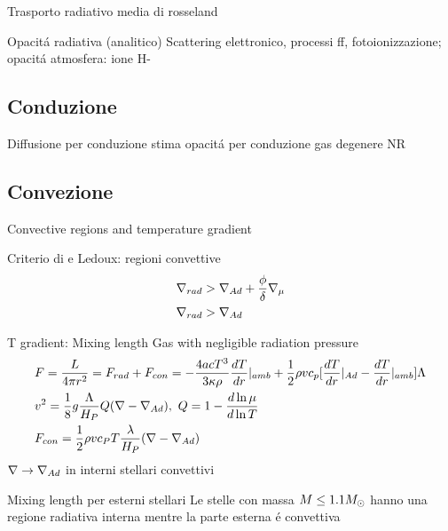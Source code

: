 \begin{frame}{Trasporto radiativo}
media di rosseland
\end{frame}

\begin{frame}{Opacit\'a radiativa (analitico)}
Scattering elettronico, processi ff, fotoionizzazione; opacit\'a atmosfera: ione H-
\end{frame}

\subsection{Conduzione}

\begin{frame}{Diffusione per conduzione}
stima opacit\'a per conduzione gas degenere NR
\end{frame}

\subsection{Convezione}

\begin{frame}{Convective regions and temperature gradient}
\begin{block}{Criterio di \sch e Ledoux: regioni convettive}
\begin{align*}
&\nabla_{rad}{}>\nabla_{Ad}+\frac{\phi}{\delta}\nabla_{\mu}{}\\
&\nabla_{rad}{}>\nabla_{Ad}
\end{align*}
\end{block}
\begin{block}{T gradient: Mixing length}
Gas with negligible radiation pressure
\begin{align*}
&F=\frac{L}{4\pi r^2}=F_{rad}+F_{con}=-\frac{4acT^3}{3\kappa\rho}\TDy{r}{T}|_{amb}+\frac{1}{2}\rho vc_p[\TDy{r}{T}|_{Ad}-\TDy{r}{T}|_{amb}]\Lambda\\
&v^2=\frac{1}{8}g\frac{\Lambda}{H_P}Q(\nabla-\nad),\ Q=1-\TDly{T}{\mu}\\
&F_{con}=\frac{1}{2}\rho vc_PT\frac{\lambda}{H_P}(\nabla-\nad{})
\end{align*}
$\nabla\to\nabla_{Ad}{}$ in interni stellari convettivi
\end{block}
\end{frame}

\begin{frame}{Mixing length per esterni stellari}
Le stelle con massa $M\leq1.1M_{\odot}{}$ hanno una regione radiativa interna mentre la parte esterna \'e convettiva
\end{frame}

